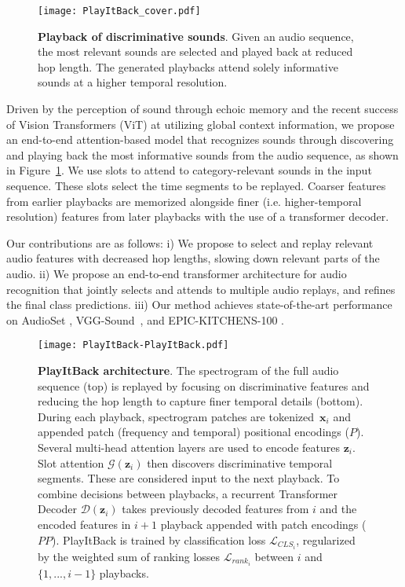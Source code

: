 \documentclass{article}
\begin{document}
\begin{figure}[ht]
    \centering
    \texttt{[image: PlayItBack\_cover.pdf]}
    \caption{\textbf{Playback of discriminative sounds}. Given an audio sequence, the most relevant sounds are selected and played back at reduced hop length. The generated playbacks attend solely informative sounds at a higher temporal resolution.}
    \vspace*{-12pt}
    \label{fig:cover}
\end{figure}

Driven by the perception of sound through echoic memory and the recent success of Vision Transformers (ViT) \cite{dosovitskiy2020image} at utilizing global context information, we propose an end-to-end attention-based model that recognizes sounds through discovering and playing back the most informative sounds from the audio sequence, as shown in Figure~\ref{fig:cover}. We use slots \cite{locatello2020object}
to attend to category-relevant sounds in the input sequence.
These slots select the time segments to be replayed. Coarser features from earlier playbacks are memorized alongside finer (i.e. higher-temporal resolution) features from later playbacks with the use of a transformer decoder.

Our contributions are as follows: i) We propose to select and replay relevant audio features with decreased hop lengths, slowing down relevant parts of the audio. ii) We propose an end-to-end transformer architecture for audio recognition that jointly selects and attends to multiple audio replays, and refines the final class predictions. iii) Our method achieves state-of-the-art performance on AudioSet \cite{gemmeke2017audio}, VGG-Sound~\cite{chen2020vggsound}, and EPIC-KITCHENS-100 \cite{damen2022rescaling}.

\begin{figure*}[ht]
\centering
\texttt{[image: PlayItBack-PlayItBack.pdf]}
\caption{\textbf{PlayItBack architecture}. 
The spectrogram of the full audio sequence (top) is replayed by focusing on discriminative features and reducing the hop length to capture finer temporal details (bottom).
During each playback, spectrogram patches are tokenized~$\mathbf{x}_i$ and appended patch (frequency and temporal) positional encodings ($P$). Several multi-head attention layers are used to encode features $\mathbf{z}_i$. Slot attention $\mathcal{G}(\mathbf{z}_i)$ then discovers discriminative temporal segments. 
These are considered input to the next playback.
To combine decisions between playbacks, a recurrent Transformer Decoder $\mathcal{D}(\mathbf{z}_i)$ takes previously decoded features from $i$ and the encoded features in $i+1$ playback appended with patch encodings ($PP$). PlayItBack is trained by classification loss $\mathcal{L}_{CLS_i}$, regularized by the weighted sum of ranking losses $\mathcal{L}_{rank_i}$ between $i$ and $\{1,...,i-1\}$ playbacks.}
\vspace*{-10pt}
\label{fig:playitback}
\end{figure*}
\end{document}
